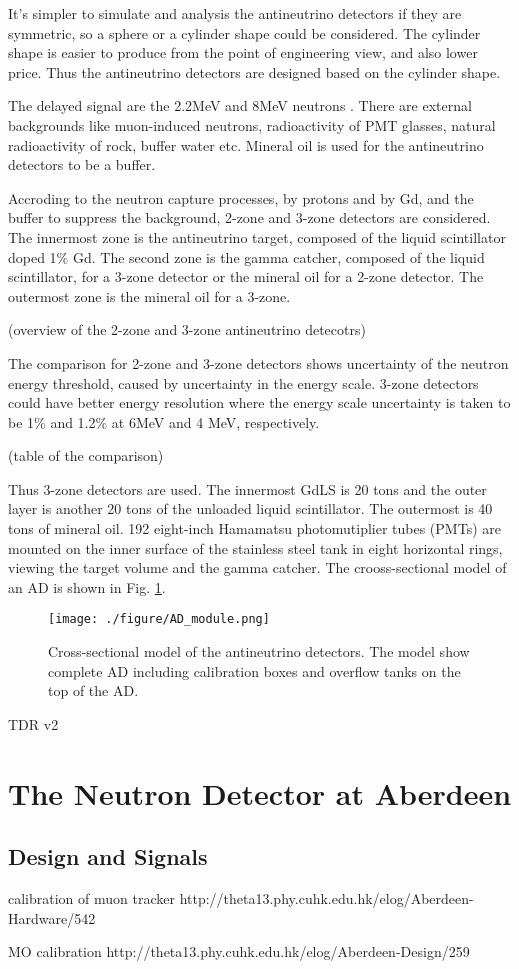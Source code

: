 It's simpler to simulate and analysis the antineutrino detectors if they are
symmetric, so a sphere or a cylinder shape could be considered. The cylinder
shape is easier to produce from the point of engineering view, and also lower
price. Thus the antineutrino detectors are designed based on the cylinder shape.

The delayed signal are the 2.2MeV and 8MeV neutrons . There are external backgrounds like
muon-induced neutrons, radioactivity of PMT glasses, natural radioactivity of rock,
buffer water etc. Mineral oil is used for the antineutrino detectors to be a buffer.

Accroding to the neutron capture processes, by protons and by Gd, and the buffer to
suppress the background, 2-zone and 3-zone detectors are considered. The innermost
zone is the antineutrino target, composed of the liquid scintillator doped 1\% Gd.
The second zone is the gamma catcher, composed of the liquid scintillator, for a
3-zone detector or the mineral oil for a 2-zone detector. The outermost zone
is the mineral oil for a 3-zone.

(overview of the 2-zone and 3-zone antineutrino detecotrs)


The comparison for 2-zone and 3-zone detectors shows 
uncertainty of the neutron energy threshold, caused by uncertainty in the energy scale.
3-zone detectors could have better energy resolution where the energy scale
uncertainty is taken to be 1\% and 1.2\% at 6MeV and 4 MeV, respectively.

(table of the comparison)

Thus 3-zone detectors are used. The innermost GdLS is 20 tons and the outer layer is another
20 tons of the unloaded  liquid scintillator. The outermost is 40 tons of mineral oil. 192 eight-inch
Hamamatsu photomutiplier tubes (PMTs) are mounted on the inner surface of the stainless steel tank
in eight horizontal rings, viewing the target volume and the gamma catcher. The crooss-sectional model of an AD
is shown in Fig. \ref{fig:AD_module.png}.

\begin{figure}[h]
    \centering
    \texttt{[image: ./figure/AD\_module.png]}
    \caption{Cross-sectional model of the antineutrino detectors.
The model show complete AD including calibration boxes and overflow tanks on the top of the AD.}
    \label{fig:AD_module.png}
    \end{figure}





TDR v2




\section{The Neutron Detector at Aberdeen}
\label{sec:ND}
\subsection{Design and Signals}

calibration of muon tracker
http://theta13.phy.cuhk.edu.hk/elog/Aberdeen-Hardware/542

MO calibration
http://theta13.phy.cuhk.edu.hk/elog/Aberdeen-Design/259


